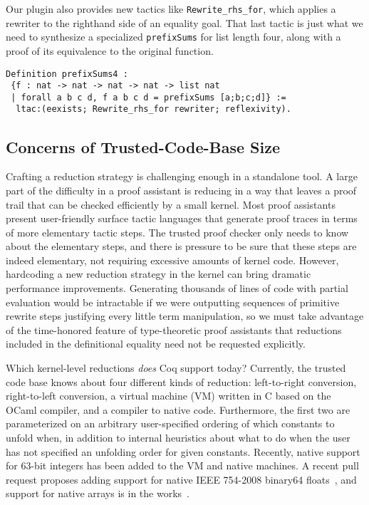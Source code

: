 \documentclass[sigplan,10pt,review,anonymous]{acmart}\settopmatter{printfolios=true,printccs=false,printacmref=false}
\begin{document}
Our plugin also provides new tactics like \texttt{Rewrite_rhs_for}, which applies a rewriter to the righthand side of an equality goal.
That last tactic is just what we need to synthesize a specialized \texttt{prefixSums} for list length four, along with a proof of its equivalence to the original function.
\begin{verbatim}
Definition prefixSums4 :
 {f : nat -> nat -> nat -> nat -> list nat
 | forall a b c d, f a b c d = prefixSums [a;b;c;d]} :=
  ltac:(eexists; Rewrite_rhs_for rewriter; reflexivity).
\end{verbatim}


\subsection{Concerns of Trusted-Code-Base Size} \label{sec:trusted-code-base-size}

Crafting a reduction strategy is challenging enough in a standalone tool.
A large part of the difficulty in a proof assistant is reducing in a way that leaves a proof trail that can be checked efficiently by a small kernel.
Most proof assistants present user-friendly surface tactic languages that generate proof traces in terms of more elementary tactic steps.
The trusted proof checker only needs to know about the elementary steps, and there is pressure to be sure that these steps are indeed elementary, not requiring excessive amounts of kernel code.
However, hardcoding a new reduction strategy in the kernel can bring dramatic performance improvements.
Generating thousands of lines of code with partial evaluation would be intractable if we were outputting sequences of primitive rewrite steps justifying every little term manipulation, so we must take advantage of the time-honored feature of type-theoretic proof assistants that reductions included in the definitional equality need not be requested explicitly.

Which kernel-level reductions \emph{does} Coq support today?
Currently, the trusted code base knows about four different kinds of reduction: left-to-right conversion, right-to-left conversion, a virtual machine (VM) written in C based on the OCaml compiler, and a compiler to native code.
Furthermore, the first two are parameterized on an arbitrary user-specified ordering of which constants to unfold when, in addition to internal heuristics about what to do when the user has not specified an unfolding order for given constants.
Recently, native support for 63-bit integers has been added to the VM and native machines.
A recent pull request proposes adding support for native IEEE 754-2008 binary64 floats~\cite{coq-pr-floats}, and support for native arrays is in the works~\cite{denes2013prim-ints-arrays}.
\end{document}
